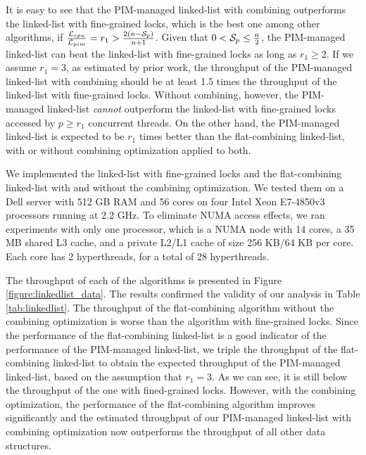 It is easy to see that the PIM-managed linked-list with combining outperforms 
the linked-list with fine-grained locks, which is the best one among other algorithms, 
if ${\mathcal{L}_{cpu} \over \mathcal{L}_{pim}} = r_1 > {2(n - \mathcal{S}_{p})\over n + 1}$.
Given that $0 < \mathcal{S}_{p} \le {n \over 2}$, 
the PIM-managed linked-list can beat the linked-list with fine-grained locks as long as $r_1 \ge 2$. 
If we assume $r_1 = 3$, as estimated by prior work, the throughput of the PIM-managed linked-list with 
combining should be at least 1.5 times the throughput of the linked-list with fine-grained locks.
Without combining, however, the PIM-managed linked-list \emph{cannot}
outperform the linked-list with fine-grained locks accessed by $p \ge r_1$ concurrent threads.
On the other hand, the PIM-managed linked-list is expected to be $r_1$ times better than 
the flat-combining linked-list, with or without combining optimization applied to both.  

We implemented the linked-list with fine-grained locks and the flat-combining linked-list 
with and without the combining optimization.
We tested them on a Dell server with 512 GB RAM and 
56 cores on four Intel Xeon E7-4850v3 processors running at 2.2 GHz.
To eliminate NUMA access effects, we ran experiments with only one processor, 
which is a NUMA node with 14 cores, a 35 MB shared L3 cache, 
and a private L2/L1 cache of size 256 KB/64 KB per core. 
Each core has 2 hyperthreads, for a total of 28 hyperthreads. 

The throughput of each of the algorithms is presented in Figure \ref{figure:linkedlist_data}.
The results confirmed the validity of our analysis in Table \ref{tab:linkedlist}.
The throughput of the flat-combining algorithm without the combining optimization
is worse than the algorithm with fine-grained locks.
Since the performance of the flat-combining linked-list is a good 
indicator of the performance of the PIM-managed linked-list, 
we triple the throughput of the flat-combining linked-list to obtain the expected throughput 
of the PIM-managed linked-list, based on the assumption that $r_1 = 3$. 
As we can see, it is still below the throughput of the one with fined-grained locks.
However, with the combining optimization, the performance of the flat-combining
algorithm improves significantly and the estimated throughput of our PIM-managed
linked-list with combining optimization now outperforms the throughput of all other data structures.

